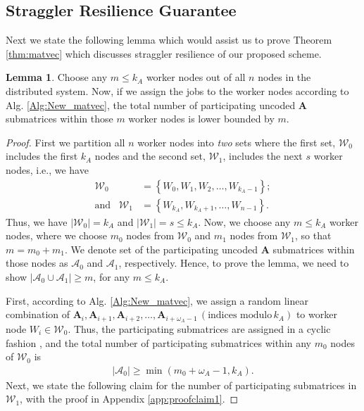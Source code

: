 \documentclass[conference]{IEEEtran}
\theoremstyle{definition}
\newtheorem{lemma}{Lemma}
\newcommand{\calA}{\mathcal{A}}
\newcommand{\calW}{\mathcal{W}}
\newcommand{\bfA}{\mathbf{A}}
\begin{document}
\subsection{Straggler Resilience Guarantee}
Next we state the following lemma which would assist us to prove Theorem \ref{thm:matvec} which discusses straggler resilience of our proposed scheme.

\begin{lemma}
\label{lem:hall}
Choose any $m \leq k_A$ worker nodes out of all $n$ nodes in the distributed system. Now, if we assign the jobs to the worker nodes according to Alg. \ref{Alg:New_matvec}, the total number of participating uncoded $\bfA$ submatrices within those $m$ worker nodes is lower bounded by $m$. 
\end{lemma}

\begin{proof}
First we partition all $n$ worker nodes into {\it two} sets where the first set, $\calW_0$ includes the first $k_A$ nodes and the second set, $\calW_1$, includes the next $s$ worker nodes, i.e., we have 
\begin{align*}
    \calW_0 &= \left\lbrace W_0, W_1, W_2, \dots, W_{k_A - 1} \right\rbrace ; \\
\textrm{and} \;\; \;  \calW_1 &= \left\lbrace W_{k_A}, W_{k_A+1}, \dots, W_{n-1}  \right\rbrace . 
\end{align*} Thus, we have $|\calW_0| = k_A$ and $|\calW_1| = s \leq k_A$. Now, we choose any $m \leq k_A$ worker nodes, where we choose $m_0$ nodes from $\calW_0$ and $m_1$ nodes from $\calW_1$, so that $m = m_0 + m_1$. We denote set of the participating uncoded $\bfA$ submatrices within those nodes as $\calA_0$ and $\calA_1$, respectively. Hence, to prove the lemma, we need to show $|\calA_0 \cup \calA_1| \geq m$, for any $m \leq k_A$. 

First, according to Alg. \ref{Alg:New_matvec}, we assign a random linear combination of $\bfA_i, \bfA_{i + 1}, \bfA_{i + 2}, \dots, \bfA_{i+\omega_A - 1} \, \left(\textrm{indices modulo} \, k_A \right)$ to worker node $W_i \in \calW_0$. Thus, the participating submatrices are assigned in a cyclic fashion \cite{das2020coded}, and the total number of participating submatrices within any $m_0$ nodes of $\calW_0$ is  
\begin{align}
\label{eq:m1}
|\calA_0| \geq \min (m_0 + \omega_A - 1, k_A).
\end{align} Next, we state the following claim for the number of participating submatrices in $\calW_1$, with the proof in Appendix \ref{app:proofclaim1}.


\end{proof}
\end{document}
